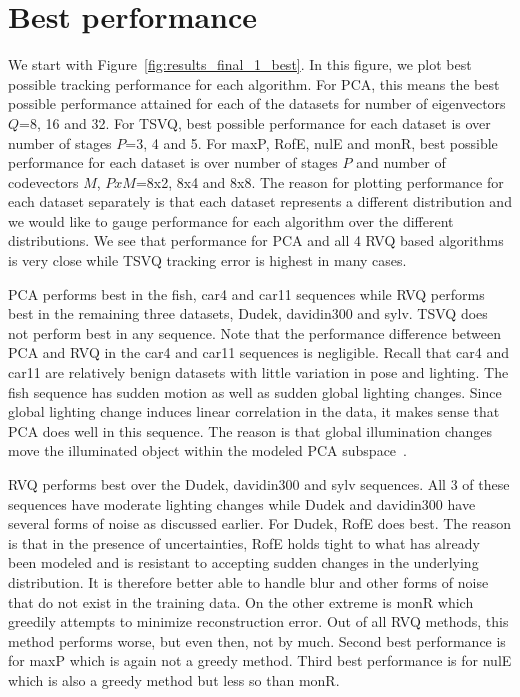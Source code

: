 \section{Best performance}
We start with Figure~\ref{fig:results_final_1_best}.  In this figure, we plot best possible tracking performance for each algorithm.  For PCA, this means the best possible performance attained for each of the datasets for number of eigenvectors $Q$=8, 16 and 32.  For TSVQ, best possible performance for each dataset is over number of stages $P$=3, 4 and 5.  For maxP, RofE, nulE and monR, best possible performance for each dataset is over number of stages $P$ and number of codevectors $M$, $PxM$=8x2, 8x4 and 8x8.  The reason for plotting performance for each dataset separately is that each dataset represents a different distribution and we would like to gauge performance for each algorithm over the different distributions.  We see that performance for PCA and all 4 RVQ based algorithms is very close while TSVQ tracking error is highest in many cases.  

PCA performs best in the fish, car4 and car11 sequences while RVQ performs best in the remaining three datasets, Dudek, davidin300 and sylv.  TSVQ does not perform best in any sequence.  Note that the performance difference between PCA and RVQ in the car4 and car11 sequences is negligible.  Recall that car4 and car11 are relatively benign datasets with little variation in pose and lighting.  The fish sequence has sudden motion as well as sudden global lighting changes.   Since global lighting change induces linear correlation in the data, it makes sense that PCA does well in this sequence.  The reason is that global illumination changes move the illuminated object within the modeled PCA subspace~\cite{1987_JNL_Faces_Sirovich}.  %

RVQ performs best over the Dudek, davidin300 and sylv sequences.  All 3 of these sequences have moderate lighting changes while Dudek and davidin300 have several forms of noise as discussed earlier.  For Dudek, RofE does best.  The reason is that in the presence of uncertainties, RofE holds tight to what has already been modeled and is resistant to accepting sudden changes in the underlying distribution.  It is therefore better able to handle blur and other forms of noise that do not exist in the training data.  On the other extreme is monR which greedily attempts to minimize reconstruction error.  Out of all RVQ methods, this method performs worse, but even then, not by much.  Second best performance is for maxP which is again not a greedy method.  Third best performance is for nulE which is also a greedy method but less so than monR.


